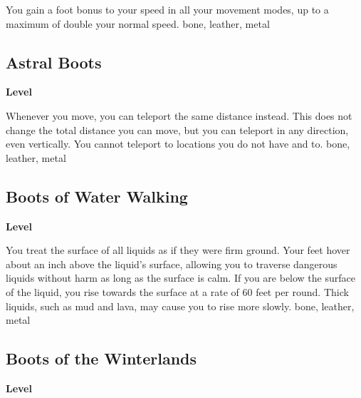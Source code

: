 \vspace{-1.5em}  %
You gain a  foot bonus to your speed in all your movement modes, up to a maximum of double your normal speed.
 
 bone, leather, metal
\begin{multicols}{2}
\lowercase{\hypertarget{item:Astral Boots}{}}\label{item:Astral Boots}
\hypertarget{item:Astral Boots}{\subsection{Astral Boots}}
\columnbreak%
\begin{flushright}
\large\textbf{ Level}
\end{flushright}
\end{multicols}
\vspace{-1.5em}  %
Whenever you move, you can teleport the same distance instead.
This does not change the total distance you can move, but you can teleport in any direction, even vertically.
You cannot teleport to locations you do not have  and  to.
 
 bone, leather, metal
\begin{multicols}{2}
\lowercase{\hypertarget{item:Boots of Water Walking}{}}\label{item:Boots of Water Walking}
\hypertarget{item:Boots of Water Walking}{\subsection{Boots of Water Walking}}
\columnbreak%
\begin{flushright}
\large\textbf{ Level}
\end{flushright}
\end{multicols}
\vspace{-1.5em}  %
You treat the surface of all liquids as if they were firm ground.
Your feet hover about an inch above the liquid's surface, allowing you to traverse dangerous liquids without harm as long as the surface is calm.
If you are below the surface of the liquid, you rise towards the surface at a rate of 60 feet per round.
Thick liquids, such as mud and lava, may cause you to rise more slowly.
 
 bone, leather, metal
\begin{multicols}{2}
\lowercase{\hypertarget{item:Boots of the Winterlands}{}}\label{item:Boots of the Winterlands}
\hypertarget{item:Boots of the Winterlands}{\subsection{Boots of the Winterlands}}
\columnbreak%
\begin{flushright}
\large\textbf{ Level}
\end{flushright}
\end{multicols}
